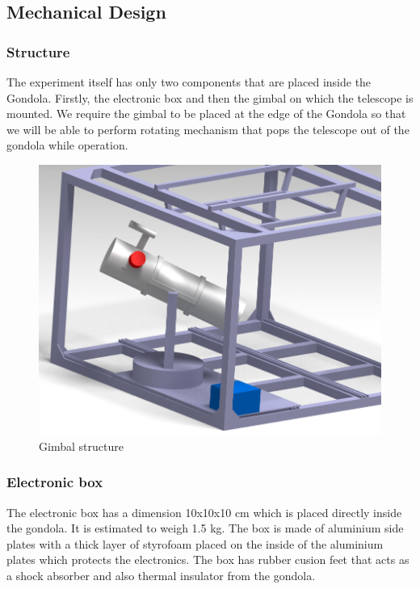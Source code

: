\newpage
\subsection{Mechanical Design} \label{Mechanical_Design}
\label{sec:mechanical-design}

\subsubsection{Structure}
\label{sec:4.4.1}
The experiment itself has only two components that are placed inside the Gondola. Firstly, the electronic box and then the gimbal on which the telescope is mounted. We require the gimbal to be placed at the edge of the Gondola so that  we will be able to perform rotating mechanism that pops the telescope out of the gondola while operation.

\begin{figure}[H]
    \centering
	\includegraphics[scale=.8]{4-experiment-design/img/mechanical/Assembly_3.png}
	\caption{Gimbal structure}
\end{figure}
\subsubsection{Electronic box}
\label{sec:4.4.2}
The electronic box has a dimension 10x10x10 cm which is placed directly inside the gondola. It is estimated to weigh 1.5 kg. The box is made of aluminium side plates with a thick layer of styrofoam placed on the inside of the aluminium plates which protects the electronics. The box has rubber cusion feet that acts as a shock absorber and also thermal insulator from the gondola.

